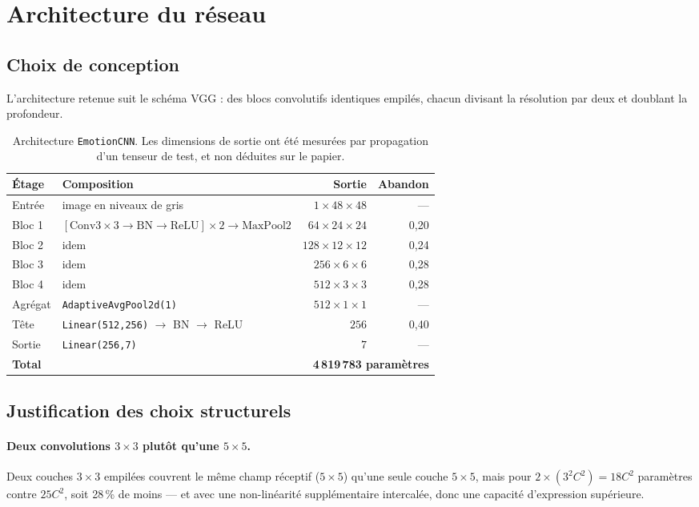 \documentclass[11pt,a4paper]{article}
\newcommand{\code}[1]{\texttt{\small #1}}
\begin{document}
\section{Architecture du réseau}

\subsection{Choix de conception}

L'architecture retenue suit le schéma VGG : des blocs convolutifs identiques
empilés, chacun divisant la résolution par deux et doublant la profondeur.

\begin{table}[h]
\centering
\small
\begin{tabular}{llrr}
\toprule
\textbf{Étage} & \textbf{Composition} & \textbf{Sortie} & \textbf{Abandon} \\
\midrule
Entrée   & image en niveaux de gris & $1\times48\times48$ & --- \\
Bloc 1   & $[\text{Conv}3{\times}3 \to \text{BN} \to \text{ReLU}]\times2 \to \text{MaxPool}2$ & $64\times24\times24$ & 0{,}20 \\
Bloc 2   & idem & $128\times12\times12$ & 0{,}24 \\
Bloc 3   & idem & $256\times6\times6$ & 0{,}28 \\
Bloc 4   & idem & $512\times3\times3$ & 0{,}28 \\
Agrégat  & \code{AdaptiveAvgPool2d(1)} & $512\times1\times1$ & --- \\
Tête     & \code{Linear(512,256)} $\to$ BN $\to$ ReLU & $256$ & 0{,}40 \\
Sortie   & \code{Linear(256,7)} & $7$ & --- \\
\midrule
\multicolumn{2}{l}{\textbf{Total}} & \multicolumn{2}{r}{\textbf{4\,819\,783 paramètres}} \\
\bottomrule
\end{tabular}
\caption{Architecture \code{EmotionCNN}. Les dimensions de sortie ont été
mesurées par propagation d'un tenseur de test, et non déduites sur le papier.}
\label{tab:archi}
\end{table}

\subsection{Justification des choix structurels}

\paragraph{Deux convolutions $3\times3$ plutôt qu'une $5\times5$.}
Deux couches $3\times3$ empilées couvrent le même champ réceptif ($5\times5$)
qu'une seule couche $5\times5$, mais pour $2\times(3^2 C^2) = 18C^2$ paramètres
contre $25C^2$, soit 28\,\% de moins --- et avec une non-linéarité
supplémentaire intercalée, donc une capacité d'expression supérieure.
\end{document}
